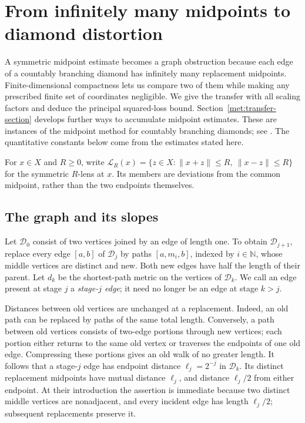 \section{From infinitely many midpoints to diamond distortion}\label{met:section}
A symmetric midpoint estimate becomes a graph obstruction because each edge
of a countably branching diamond has infinitely many replacement midpoints.
Finite-dimensional compactness lets us compare two of them while making
any prescribed finite set of coordinates negligible. We give the transfer
with all scaling factors and deduce the principal squared-loss bound.
Section~\ref{met:transfer-section} develops further ways to accumulate
midpoint estimates. These are instances of the midpoint method for countably
branching diamonds; see \cite[Section~4]{BaudierEtAl2017}. The quantitative
constants below come from the estimates stated here.

For $x\in X$ and $R\ge0$, write
$\mathcal L_R(x)=\{z\in X:\|x+z\|\le R,\ \|x-z\|\le R\}$
for the symmetric $R$-lens at $x$. Its members are deviations from the
common midpoint, rather than the two endpoints themselves.

\subsection{The graph and its slopes}\label{met:graph-definition}
Let $\mathcal D_0$ consist of two vertices joined by an edge of length one.
To obtain $\mathcal D_{j+1}$, replace every edge $[a,b]$ of $\mathcal D_j$
by paths $[a,m_i,b]$, indexed by $i\in\mathbb N$, whose middle vertices
are distinct and new. Both new edges have half the length of their parent.
Let $d_k$ be the shortest-path metric on the vertices of $\mathcal D_k$.
We call an edge present at stage $j$ a \emph{stage-$j$ edge}; it need no
longer be an edge at stage $k>j$.

Distances between old vertices are unchanged at a replacement. Indeed,
an old path can be replaced by paths of the same total length. Conversely,
a path between old vertices consists of two-edge portions through new
vertices; each portion either returns to the same old vertex or traverses
the endpoints of one old edge. Compressing these portions gives an old
walk of no greater length. It follows that a stage-$j$ edge has endpoint
distance $\ell_j=2^{-j}$ in $\mathcal D_k$. Its distinct replacement
midpoints have mutual distance $\ell_j$, and distance $\ell_j/2$ from
either endpoint. At their introduction the assertion is immediate because
two distinct middle vertices are nonadjacent, and every incident edge has
length $\ell_j/2$; subsequent replacements preserve it.

